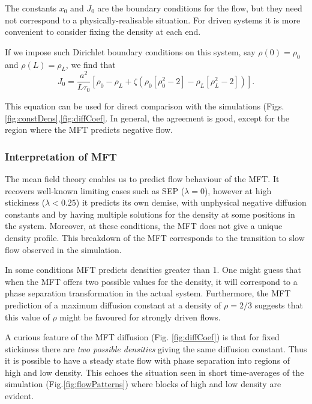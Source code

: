 \documentclass[
reprint, amsmath,amssymb,
]{revtex4-1}
\begin{document}
The constants $x_0$ and $J_0$ are the boundary conditions for the
flow, but they need not correspond to a physically-realisable
situation.  For driven systems it is more convenient to consider fixing
the density at each end. 

If we impose such Dirichlet boundary conditions on this system, say
$\rho(0)=\rho_0$ and $\rho(L)=\rho_L$, we find that
\begin{equation}\label{eq:MFTflow}
 J_0 = \frac{a^2}{L \tau_0} \left[ \rho_0 - \rho_L + \zeta \left( \rho_0\left[\rho_0^2-2\right] - \rho_L\left[\rho_L^2-2\right] \right) \right].
\end{equation}

This equation can be used for direct comparison with the simulations
(Figs.\ref{fig:constDens},\ref{fig:diffCoef}.  In general, the agreement is
good, except for the region where the MFT predicts negative flow.


\subsubsection{Interpretation of MFT}

The mean field theory enables us to predict flow behaviour of the MFT.
It recovers well-known limiting cases such as SEP ($\lambda=0$),
however at high stickiness ($\lambda<0.25$) it predicts its own
demise, with unphysical negative diffusion constants and by having
multiple solutions for the density at some positions in the system.
Moreover, at these conditions, the MFT does not give a unique density
profile.  This breakdown of the MFT corresponds to the transition to
slow flow observed in the simulation.

In some
conditions MFT predicts densities greater than 1.  One might guess that when the
MFT offers two possible values for the density, it will correspond to
a phase separation transformation in the actual system. Furthermore,
the MFT prediction of a maximum diffusion constant at a density of
$\rho=2/3$ suggests that this value of $\rho$ might be favoured for
strongly driven flows.

A curious feature of the MFT diffusion (Fig. \ref{fig:diffCoef}) is
that for fixed stickiness there are {\it two possible densities}
giving the same diffusion constant.  Thus it is possible to have a
steady state flow with phase separation into regions of high and low
density. This echoes the situation seen in short time-averages of the
simulation (Fig.\ref{fig:flowPatterns}) where blocks of high and low
density are evident.
\end{document}
